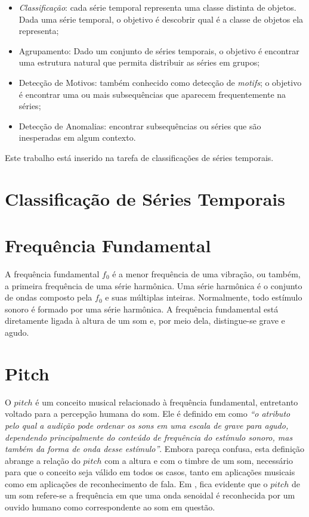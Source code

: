 \begin{itemize}
	\item \textit{Classificação}: cada série temporal representa uma classe distinta de objetos. Dada uma série temporal, o objetivo é descobrir qual é a classe de objetos ela representa; 
	\item Agrupamento: Dado um conjunto de séries temporais, o objetivo é encontrar uma estrutura natural que permita distribuir as séries em grupos; 
	\item Detecção de Motivos: também conhecido como detecção de \textit{motifs}; o objetivo é encontrar uma ou mais subsequências que aparecem frequentemente na séries;
	\item Detecção de Anomalias: encontrar subsequências ou séries que são inesperadas em algum contexto.
\end{itemize}
Este trabalho está inserido na tarefa de classificações de séries temporais.
\section{Classificação de Séries Temporais}


\section{Frequência Fundamental}

A frequência fundamental $f_0$ é a menor frequência de uma vibração, ou também, a primeira frequência de uma série harmônica. Uma série harmônica é o conjunto de ondas composto pela $f_0$ e suas múltiplas inteiras. Normalmente, todo estímulo sonoro é formado por uma série harmônica. A frequência fundamental está diretamente ligada à altura de um som e, por meio dela, distingue-se grave e agudo.


\section{Pitch}


O $pitch$ é um conceito musical relacionado à frequência fundamental, entretanto voltado para a percepção humana do som. Ele é definido em \cite{hartmann1996} como \textit{``o atributo pelo qual a audição pode ordenar os sons em uma escala de grave para agudo, dependendo principalmente do conteúdo de frequência do estímulo sonoro, mas também da forma de onda desse estímulo''}. Embora pareça confusa, esta definição abrange a relação do $pitch$ com a altura e com o timbre de um som, necessário para que o conceito seja válido em todos os casos, tanto em aplicações musicais como em aplicações de reconhecimento de fala. Em \cite{klapuri2006}, fica evidente que o $pitch$ de um som refere-se a frequência em que uma onda senoidal é reconhecida por um ouvido humano como correspondente ao som em questão.


